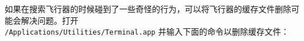 如果在搜索飞行器的时候碰到了一些奇怪的行为，可以将飞行器的缓存文件删除可能会解决问题。打开\\ \texttt{/Applications/Utilities/Terminal.app} 并输入下面的命令以删除缓存文件：
\fi
%
%
